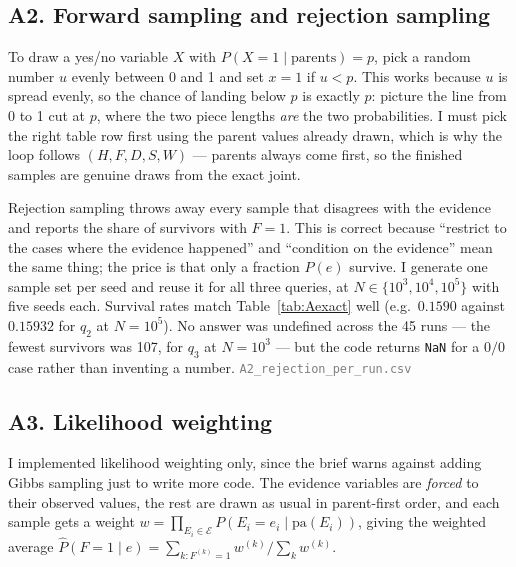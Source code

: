 \documentclass[12pt,a4paper]{article}
\newcommand{\file}[1]{\textcolor{gray}{\small\texttt{#1}}}
\begin{document}
\subsection{A2. Forward sampling and rejection sampling}

To draw a yes/no variable $X$ with $P(X{=}1\mid\text{parents})=p$, pick a random number $u$ evenly
between 0 and 1 and set $x=1$ if $u<p$. This works because $u$ is spread evenly, so the chance of landing
below $p$ is exactly $p$: picture the line from 0 to 1 cut at $p$, where the two piece lengths \emph{are}
the two probabilities. I must pick the right table row first using the parent values already drawn, which
is why the loop follows $(H,F,D,S,W)$ --- parents always come first, so the finished samples are genuine
draws from the exact joint.

Rejection sampling throws away every sample that disagrees with the evidence and reports the share
of survivors with $F{=}1$. This is correct because ``restrict to the cases where the evidence
happened'' and ``condition on the evidence'' mean the same thing; the price is that only a fraction
$P(e)$ survive. I generate one sample set per seed and reuse it for all three queries, at
$N\in\{10^3,10^4,10^5\}$ with five seeds each. Survival rates match Table~\ref{tab:Aexact} well (e.g.\
$0.1590$ against $0.15932$ for $q_2$ at $N{=}10^5$). No answer was undefined across the 45 runs --- the
fewest survivors was 107, for $q_3$ at $N{=}10^3$ --- but the code returns \texttt{NaN} for a $0/0$
case rather than inventing a number.
\file{A2\_rejection\_per\_run.csv}

\subsection{A3. Likelihood weighting}

I implemented likelihood weighting only, since the brief warns against adding Gibbs sampling just to write
more code. The evidence variables are \emph{forced} to their observed values, the rest are drawn as usual in
parent-first order, and each sample gets a weight
$w=\prod_{E_i\in\mathcal{E}}P(E_i{=}e_i\mid\mathrm{pa}(E_i))$, giving the weighted average
$\hat P(F{=}1\mid e)=\sum_{k:F^{(k)}=1}w^{(k)}\big/\sum_k w^{(k)}$.
\end{document}
